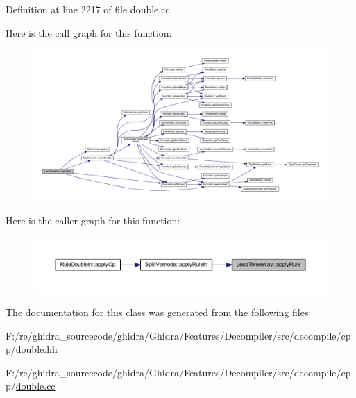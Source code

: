 Definition at line 2217 of file double.\+cc.

Here is the call graph for this function\+:
\nopagebreak
\begin{figure}[H]
\begin{center}
\leavevmode
\includegraphics[width=350pt]{class_less_three_way_a8f691c128645dbb763b63dcfffa08fd7_cgraph}
\end{center}
\end{figure}
Here is the caller graph for this function\+:
\nopagebreak
\begin{figure}[H]
\begin{center}
\leavevmode
\includegraphics[width=350pt]{class_less_three_way_a8f691c128645dbb763b63dcfffa08fd7_icgraph}
\end{center}
\end{figure}


The documentation for this class was generated from the following files\+:\begin{DoxyCompactItemize}
\item 
F\+:/re/ghidra\+\_\+sourcecode/ghidra/\+Ghidra/\+Features/\+Decompiler/src/decompile/cpp/\mbox{\hyperlink{double_8hh}{double.\+hh}}\item 
F\+:/re/ghidra\+\_\+sourcecode/ghidra/\+Ghidra/\+Features/\+Decompiler/src/decompile/cpp/\mbox{\hyperlink{double_8cc}{double.\+cc}}\end{DoxyCompactItemize}
